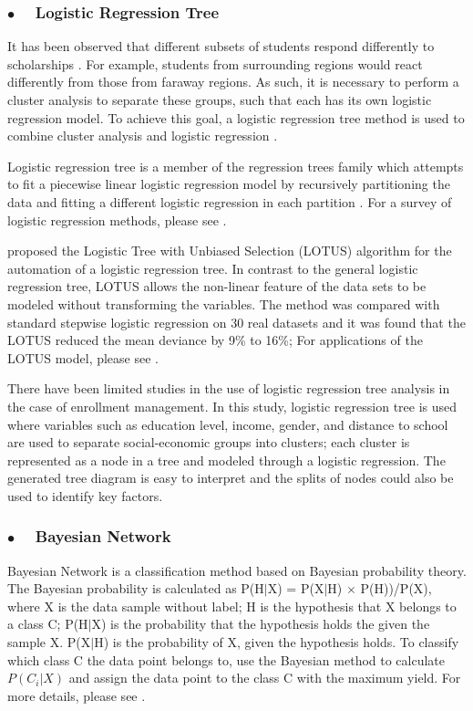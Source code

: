 \documentclass[12pt,english]{report}
\begin{document}
\subsubsection{$\bullet \quad$  Logistic Regression Tree}

It has been observed that  different subsets of students respond differently to
scholarships \citep{Curs2002, Heller1999}. For example, students from
surrounding regions would react differently from those from faraway regions. As
such, it is necessary to perform a cluster analysis to separate these groups,
such that each has its own logistic regression model. To achieve this goal, a
logistic regression tree method is used to combine cluster analysis and
logistic regression \citep{Loh2011}.

Logistic regression tree is a member of the regression trees family which
attempts to fit a piecewise linear logistic regression model by recursively
partitioning the data and fitting a different logistic regression in each
partition \citep{lotus2}. For a survey of logistic regression methods, please
see \citep{harrell2013regression_book}.
	
\citet{lotus2} proposed the Logistic Tree with Unbiased Selection (LOTUS)
algorithm for the automation of a logistic regression tree. In contrast to the
general logistic regression tree, LOTUS allows the non-linear feature of the
data sets to be modeled without transforming the variables. The method was
compared with standard stepwise logistic regression on 30 real datasets and it
was found that the LOTUS reduced the mean deviance by 9\% to 16\%;  For
applications of the LOTUS model, please see \citep{lotus_app1,lotus_app2}.

There have been limited studies in the use of logistic regression tree analysis
in the case of enrollment management. In this study, logistic regression tree
is used where variables such as education level, income, gender, and distance
to school are used to separate  social-economic groups into clusters; each
cluster is represented as a node in a tree and modeled through a logistic
regression. The generated tree diagram is easy to interpret and the splits of
nodes could also be used to identify key factors.

\subsubsection {$\bullet \quad$ Bayesian Network}
Bayesian Network is a classification method based on Bayesian probability
theory.
The Bayesian probability is calculated as P(H$|$X) = P(X$|$H)  $\times$
P(H))/P(X), where X is the data sample without label; H is the hypothesis that
X belongs to a class C; P(H$|$X) is the probability that the hypothesis holds
the given the sample X.
P(X$|$H) is the probability of X, given the hypothesis holds. 
To classify which class C the data point belongs to, use the Bayesian method to
calculate $P(C_i|X)$ and assign the data point to the class C with the maximum
yield.
For more details, please see \citep{Han2011}.
\end{document}
